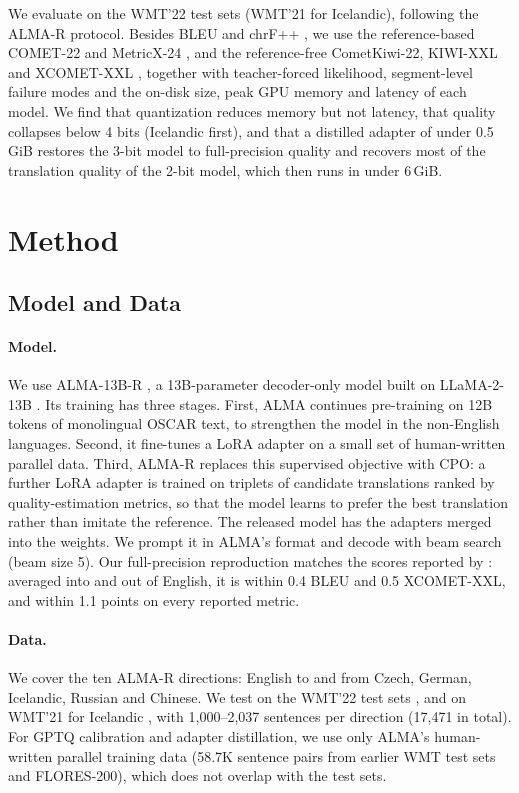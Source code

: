 \documentclass[10pt]{article}
\begin{document}
We evaluate on the WMT'22 test sets (WMT'21 for Icelandic), following the ALMA-R
protocol. Besides BLEU and chrF++ \citep{papineni2002bleu,popovic2017chrf}, we
use the reference-based COMET-22 \citep{rei2022comet22} and MetricX-24
\citep{juraska2024metricx}, and the reference-free CometKiwi-22, KIWI-XXL and
XCOMET-XXL \citep{rei2022cometkiwi,rei2023scaling,guerreiro2024xcomet}, together
with teacher-forced likelihood, segment-level failure modes and the on-disk size,
peak GPU memory and latency of each model. We find that quantization reduces memory but not latency, that
quality collapses below 4 bits (Icelandic first), and that a distilled adapter
of under 0.5\,GiB restores the 3-bit model to full-precision quality and
recovers most of the translation quality of the 2-bit model, which then runs in under 6\,GiB.

\section{Method}

\subsection{Model and Data}

\paragraph{Model.} We use ALMA-13B-R \citep{xu2024cpo}, a 13B-parameter
decoder-only model built on LLaMA-2-13B \citep{touvron2023llama2}. Its training
has three stages. First, ALMA \citep{xu2024alma} continues pre-training on 12B
tokens of monolingual OSCAR text, to strengthen the model in the non-English
languages. Second, it fine-tunes a LoRA adapter \citep{hu2022lora} on a small set
of human-written parallel data. Third, ALMA-R replaces this supervised objective
with CPO: a further LoRA adapter is trained on triplets of candidate translations
ranked by quality-estimation metrics, so that the model learns to prefer the best
translation rather than imitate the reference. The released model has the
adapters merged into the weights. We prompt it in ALMA's format and decode with
beam search (beam size 5). Our full-precision reproduction matches the scores
reported by \citet{xu2024cpo}: averaged into and out of English, it is within
0.4 BLEU and 0.5 XCOMET-XXL, and within 1.1 points on every reported metric.

\paragraph{Data.} We cover the ten ALMA-R directions: English to and from Czech,
German, Icelandic, Russian and Chinese. We test on the WMT'22 test sets
\citep{kocmi2022findings}, and on WMT'21 for Icelandic
\citep{akhbardeh2021findings}, with 1{,}000--2{,}037 sentences per direction
(17{,}471 in total). For GPTQ calibration and adapter distillation, we use only
ALMA's human-written parallel training data (58.7K sentence pairs from earlier
WMT test sets and FLORES-200), which does not overlap with the test sets.
\end{document}
